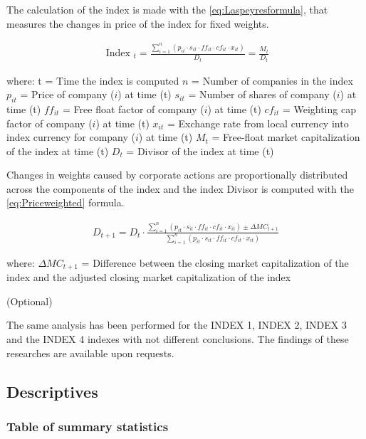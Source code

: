 \documentclass[a4paper, twoside]{templates/ociamthesis}
\begin{document}
\noindent The calculation of the index is made with the \eqref{eq:Laspeyresformula}, that measures the changes in price of the index for fixed weights.

\begin{align}
\text { Index }_{t}=\frac{\sum_{i=1}^{n}\left(p_{i t} \cdot s_{i t} \cdot f f_{i t} \cdot c f_{i t} \cdot x_{i t}\right)}{D_{t}}=\frac{M_{t}}{D_{t}}
\label{eq:Laspeyresformula}
\end{align}

\noindent where: t = Time the index is computed \(n\) = Number of companies in the index \(p_{i t}\) = Price of company (\(i\)) at time (t) \(s_{i t}\) = Number of shares of company (\(i\)) at time (t) \(f f_{i t}\) = Free float factor of company (\(i\)) at time (t) \(c f_{i t}\) = Weighting cap factor of company (\(i\)) at time (t) \(x_{i t}\) = Exchange rate from local currency into index currency for company (\(i\)) at time (t) \(M_{t}\) = Free-float market capitalization of the index at time (t) \(D_{t}\) = Divisor of the index at time (t)

\noindent Changes in weights caused by corporate actions are proportionally distributed across the components of the index and the index Divisor is computed with the \eqref{eq:Priceweighted} formula.

\begin{align}
D_{t+1}=D_{t} \cdot \frac{\sum_{i=1}^{n}\left(p_{i t} \cdot s_{i t} \cdot f f_{i t} \cdot c f_{i t} \cdot x_{i t}\right) \pm \Delta M C_{t+1}}{\sum_{i=1}^{n}\left(p_{i t} \cdot s_{i t} \cdot f f_{i t} \cdot c f_{i t} \cdot x_{i t}\right)}
\label{eq:Priceweighted}
\end{align}

\noindent where: \noindent \(\Delta M C_{t+1}\) = Difference between the closing market capitalization of the index and the adjusted closing market capitalization of the index

(Optional)

The same analysis has been performed for the INDEX 1, INDEX 2, INDEX 3 and the INDEX 4 indexes with not different conclusions. The findings of these researches are available upon requests.

\newpage

\hypertarget{descriptives}{%
\subsection{Descriptives}\label{descriptives}}

\hypertarget{table-of-summary-statistics}{%
\subsubsection{Table of summary statistics}\label{table-of-summary-statistics}}
\end{document}
